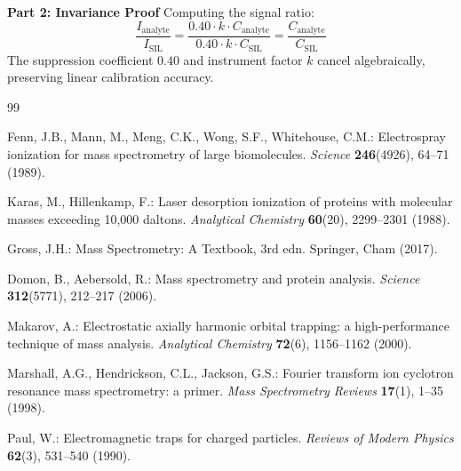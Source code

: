 \documentclass[11pt,twoside,openright]{book}
\begin{document}
\noindent\textbf{Part 2: Invariance Proof}\enspace
Computing the signal ratio:
\begin{equation}
\frac{I_{\text{analyte}}}{I_{\text{SIL}}} = \frac{0.40 \cdot k \cdot C_{\text{analyte}}}{0.40 \cdot k \cdot C_{\text{SIL}}} = \frac{C_{\text{analyte}}}{C_{\text{SIL}}}
\end{equation}
The suppression coefficient $0.40$ and instrument factor $k$ cancel algebraically, preserving linear calibration accuracy.

\begin{thebibliography}{99}

Fenn, J.B., Mann, M., Meng, C.K., Wong, S.F., Whitehouse, C.M.:
\newblock Electrospray ionization for mass spectrometry of large biomolecules.
\newblock \emph{Science} \textbf{246}(4926), 64--71 (1989).
\newblock {}

Karas, M., Hillenkamp, F.:
\newblock Laser desorption ionization of proteins with molecular masses exceeding 10,000 daltons.
\newblock \emph{Analytical Chemistry} \textbf{60}(20), 2299--2301 (1988).
\newblock {}

Gross, J.H.:
\newblock Mass Spectrometry: A Textbook, 3rd edn.
\newblock Springer, Cham (2017).
\newblock {}

Domon, B., Aebersold, R.:
\newblock Mass spectrometry and protein analysis.
\newblock \emph{Science} \textbf{312}(5771), 212--217 (2006).
\newblock {}

Makarov, A.:
\newblock Electrostatic axially harmonic orbital trapping: a high-performance technique of mass analysis.
\newblock \emph{Analytical Chemistry} \textbf{72}(6), 1156--1162 (2000).
\newblock {}

Marshall, A.G., Hendrickson, C.L., Jackson, G.S.:
\newblock Fourier transform ion cyclotron resonance mass spectrometry: a primer.
\newblock \emph{Mass Spectrometry Reviews} \textbf{17}(1), 1--35 (1998).
\newblock {}

Paul, W.:
\newblock Electromagnetic traps for charged particles.
\newblock \emph{Reviews of Modern Physics} \textbf{62}(3), 531--540 (1990).
\newblock {}


\end{thebibliography}
\end{document}
